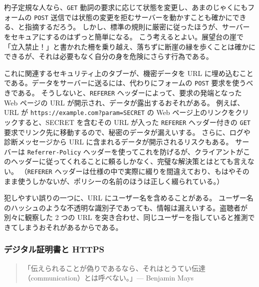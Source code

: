 \documentclass[uplatex]{jsarticle}
\def\label#1{}%
\begin{document}
杓子定規な人なら、\texttt{GET} 動詞の要求に応じて状態を変更し、あまのじゃくにもフォームの \texttt{POST} 送信では状態の変更を拒むサーバーを動かすことも確かにできる、と指摘するだろう。
しかし、標準の規則に厳密に従ったほうが、サーバーをセキュアにするのはずっと簡単になる。
こう考えるとよい。展望台の崖で「立入禁止！」と書かれた柵を乗り越え、落ちずに断崖の縁を歩くことは確かにできるが、それは必要もなく自分の身を危険にさらす行為である。

\begin{rem}\label{rem:ch11-no-secrets-in-url}
これに関連するセキュリティ上のタブーが、機密データを URL に埋め込むことである。データをサーバーに送るには、代わりにフォームの \texttt{POST} 要求を使うべきである。
そうしないと、\texttt{REFERER} ヘッダーによって、要求の発端となった Web ページの URL が開示され、データが露出するおそれがある。
例えば、URL が \texttt{https://example.com?param=SECRET} の Web ページ上のリンクをクリックすると、SECRET を含むその URL が入った \texttt{REFERER} ヘッダー付きの \texttt{GET} 要求でリンク先に移動するので、秘密のデータが漏えいする。
さらに、ログや診断メッセージから URL に含まれるデータが開示されるリスクもある。
サーバーは \texttt{Referrer-Policy} ヘッダーを使ってこれを防げるが、クライアントがこのヘッダーに従ってくれることに頼るしかなく、完璧な解決策とはとても言えない。
（\texttt{REFERER} ヘッダーは仕様の中で実際に綴りを間違えており、もはやそのまま使うしかないが、ポリシーの名前のほうは正しく綴られている。）
\end{rem}

\begin{rem}\label{rem:ch11-no-usernames-in-url}
犯しやすい誤りの一つに、URL にユーザー名を含めることがある。
ユーザー名のハッシュのような不透明な識別子であっても、情報は漏えいする。盗聴者が別々に観察した 2 つの URL を突き合わせ、同じユーザーを指していると推測できてしまうおそれがあるからである。
\end{rem}

\subsubsection{デジタル証明書と HTTPS}\label{subsec:ch11-https}

\begin{quote}
「伝えられることが偽りであるなら、それはとうてい伝達（communication）とは呼べない。」\hfill --- Benjamin Mays
\end{quote}
\end{document}
